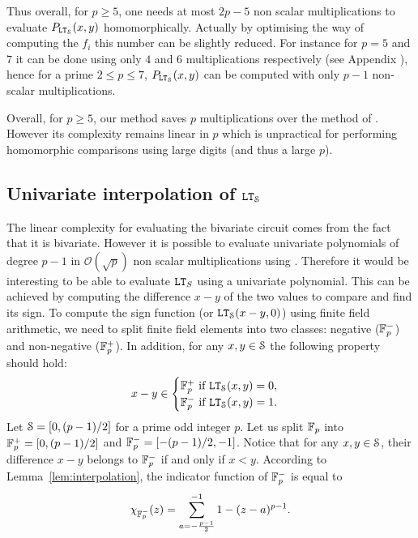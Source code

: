 Thus overall, for $p\geq 5$, one needs at most $2p-5$ non scalar multiplications to evaluate $P_{\LT_\S}(x,y)$ homomorphically. Actually by optimising the way of computing the $f_i$ this number can be slightly reduced. For instance for $p=5$ and $7$ it can be done using only $4$ and $6$ multiplications respectively (see Appendix ), hence for a prime $2\leq p \leq 7$, $P_{\LT_\S}(x,y)$ can be computed with only $p-1$ non-scalar multiplications.

Overall, for $p\geq 5$, our method saves $p$ multiplications over the method of \cite{TLWRK20}. However its complexity remains linear in $p$ which is unpractical for performing homomorphic comparisons using large digits (and thus a large $p$).
  
\subsection{Univariate interpolation of $\LT_\S$}
The linear complexity for evaluating the bivariate circuit comes from the fact that it is bivariate. However it is possible to evaluate univariate polynomials of degree $p-1$ in $\mathcal{O}(\sqrt{p})$ non scalar multiplications using \cite{SIAM:PS73}. Therefore it would be interesting to be able to evaluate $\LT_S$ using a univariate polynomial. This can be achieved by computing the difference $x-y$ of the two values to compare and find its sign.
  To compute the sign function (or $\LT_\S(x-y,0)$) using finite field arithmetic, we need to split finite field elements into two classes:  negative ($\F_p^-$) and non-negative ($\F_p^+$).
  In addition, for any $x, y \in \S$ the following property should hold:
  \begin{align*}
    x - y \in 
    \begin{cases}
      \F_p^+ \text{ if } \LT_\S(x,y) = 0, \\
      \F_p^- \text{ if } \LT_\S(x,y) = 1.
    \end{cases}
  \end{align*}   
  Let $\S = [0, (p-1)/2]$ for a prime odd integer $p$.
  Let us split $\F_p$ into $\F_p^+ = [0, (p-1)/2]$ and $\F_p^- = [-(p-1)/2, -1]$.
  Notice that for any $x, y \in \S$, their difference $x - y$ belongs to $\F_p^-$ if and only if $x < y$.
  According to Lemma~\ref{lem:interpolation}, the indicator function of $\F_p^-$ is equal to
  \begin{align*}
    \chi_{\F_p^-}(z) = \sum_{a=-\frac{p-1}{2}}^{-1} 1 - (z - a)^{p-1}.
  \end{align*}
